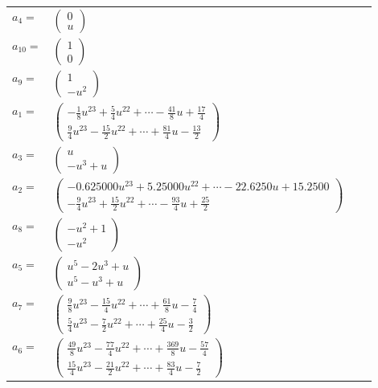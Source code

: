\documentclass[1p]{elsarticle_modified}
\theoremstyle{definition}
\begin{document}
\begin{tabular}{m{7pt} m{180pt} m{7pt} m{180pt} }
\flushright $a_{4}=$&$\begin{pmatrix}0\\u\end{pmatrix}$ \\
\flushright $a_{10}=$&$\begin{pmatrix}1\\0\end{pmatrix}$ \\
\flushright $a_{9}=$&$\begin{pmatrix}1\\- u^2\end{pmatrix}$ \\
\flushright $a_{1}=$&$\begin{pmatrix}-\frac{1}{8} u^{23}+\frac{5}{4} u^{22}+\cdots-\frac{41}{8} u+\frac{17}{4}\\\frac{9}{4} u^{23}-\frac{15}{2} u^{22}+\cdots+\frac{81}{4} u-\frac{13}{2}\end{pmatrix}$ \\
\flushright $a_{3}=$&$\begin{pmatrix}u\\- u^3+u\end{pmatrix}$ \\
\flushright $a_{2}=$&$\begin{pmatrix}-0.625000 u^{23}+5.25000 u^{22}+\cdots-22.6250 u+15.2500\\-\frac{9}{4} u^{23}+\frac{15}{2} u^{22}+\cdots-\frac{93}{4} u+\frac{25}{2}\end{pmatrix}$ \\
\flushright $a_{8}=$&$\begin{pmatrix}- u^2+1\\- u^2\end{pmatrix}$ \\
\flushright $a_{5}=$&$\begin{pmatrix}u^5-2 u^3+u\\u^5- u^3+u\end{pmatrix}$ \\
\flushright $a_{7}=$&$\begin{pmatrix}\frac{9}{8} u^{23}-\frac{15}{4} u^{22}+\cdots+\frac{61}{8} u-\frac{7}{4}\\\frac{5}{4} u^{23}-\frac{7}{2} u^{22}+\cdots+\frac{25}{4} u-\frac{3}{2}\end{pmatrix}$ \\
\flushright $a_{6}=$&$\begin{pmatrix}\frac{49}{8} u^{23}-\frac{77}{4} u^{22}+\cdots+\frac{369}{8} u-\frac{57}{4}\\\frac{15}{4} u^{23}-\frac{21}{2} u^{22}+\cdots+\frac{83}{4} u-\frac{7}{2}\end{pmatrix}$ \\

\end{tabular}
\end{document}

